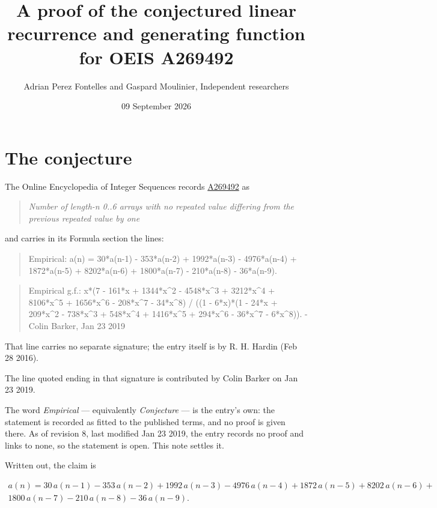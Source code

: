 \documentclass[11pt]{article}
\title{A proof of the conjectured linear recurrence and generating function for OEIS A269492}
\author{Adrian Perez Fontelles and Gaspard Moulinier, Independent researchers}
\date{09 September 2026}
\theoremstyle{definition}
\begin{document}
\maketitle
\section{The conjecture}

The Online Encyclopedia of Integer Sequences records \href{https://oeis.org/A269492}{A269492} as

\begin{quote}\itshape Number of length-n 0..6 arrays with no repeated value differing from the previous repeated value by one\end{quote}

and carries in its Formula section the lines:

\begin{quote}\ttfamily Empirical: a(n) = 30*a(n-1) - 353*a(n-2) + 1992*a(n-3) - 4976*a(n-4) + 1872*a(n-5) + 8202*a(n-6) + 1800*a(n-7) - 210*a(n-8) - 36*a(n-9).\end{quote}

\begin{quote}\ttfamily Empirical g.f.: x*(7 - 161*x + 1344*x\textasciicircum{}2 - 4548*x\textasciicircum{}3 + 3212*x\textasciicircum{}4 + 8106*x\textasciicircum{}5 + 1656*x\textasciicircum{}6 - 208*x\textasciicircum{}7 - 34*x\textasciicircum{}8) / ((1 - 6*x)*(1 - 24*x + 209*x\textasciicircum{}2 - 738*x\textasciicircum{}3 + 548*x\textasciicircum{}4 + 1416*x\textasciicircum{}5 + 294*x\textasciicircum{}6 - 36*x\textasciicircum{}7 - 6*x\textasciicircum{}8)). - Colin Barker, Jan 23 2019\end{quote}

That line carries no separate signature; the entry itself is by R. H. Hardin (Feb 28 2016).

The line quoted ending in that signature is contributed by Colin Barker on Jan 23 2019.

The word {\itshape Empirical} --- equivalently {\itshape Conjecture} --- is the entry's own: the statement is recorded as fitted to the published terms, and no proof is given there. As of revision 8, last modified Jan 23 2019, the entry records no proof and links to none, so the statement is open. This note settles it.

Written out, the claim is

\begin{multline*} a(n) = 30\,a(n-1) - 353\,a(n-2) + 1992\,a(n-3) - 4976\,a(n-4) + 1872\,a(n-5) + 8202\,a(n-6) + \\ 1800\,a(n-7) - 210\,a(n-8) - 36\,a(n-9). \end{multline*}
\end{document}
